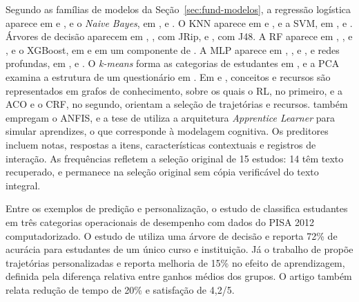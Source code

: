 Segundo as famílias de modelos da Seção~\ref{sec:fund-modelos}, a regressão logística aparece em  e , e o \textit{Naive Bayes}, em ,  e . O KNN aparece em  e , e a SVM, em ,  e . Árvores de decisão aparecem em , , com JRip, e , com J48. A RF aparece em , ,  e , e o XGBoost, em  e em um componente de . A MLP aparece em , ,  e , e redes profundas, em ,  e . O \textit{k-means} forma as categorias de estudantes em , e a PCA examina a estrutura de um questionário em . Em  e , conceitos e recursos são representados em grafos de conhecimento, sobre os quais o RL, no primeiro, e a ACO e o CRF, no segundo, orientam a seleção de trajetórias e recursos.  também empregam o ANFIS, e a tese de  utiliza a arquitetura \textit{Apprentice Learner} para simular aprendizes, o que corresponde à modelagem cognitiva. Os preditores incluem notas, respostas a itens, características contextuais e registros de interação. As frequências refletem a seleção original de 15 estudos: 14 têm texto recuperado, e  permanece na seleção original sem cópia verificável do texto integral.

Entre os exemplos de predição e personalização, o estudo de  classifica estudantes em três categorias operacionais de desempenho com dados do PISA 2012 computadorizado. O estudo de  utiliza uma árvore de decisão e reporta 72\% de acurácia para estudantes de um único curso e instituição. Já o trabalho de  propõe trajetórias personalizadas e reporta melhoria de 15\% no efeito de aprendizagem, definida pela diferença relativa entre ganhos médios dos grupos. O artigo também relata redução de tempo de 20\% e satisfação de 4,2/5.

